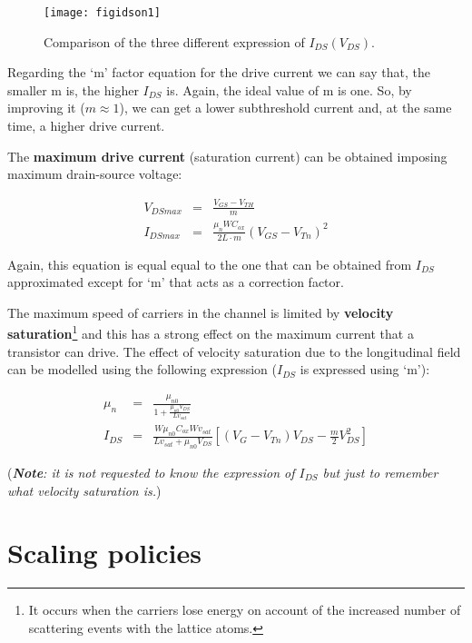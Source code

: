 \documentclass[a4paper, 12pt, twoside, openright]{report}
\begin{document}
	\begin{figure}[H]
	\centering
	\texttt{[image: figidson1]}
	\caption{Comparison of the three different expression of $I_{DS}(V_{DS})$.}
	\label{}
	\end{figure}

Regarding the `m' factor equation for the drive current we can say that, the smaller m is, the higher $I_{DS}$ is. Again, the ideal value of m is one. So, by improving it ($m \approx 1$), we can get a lower subthreshold current and, at the same time, a higher drive current.

The \textbf{maximum drive current} (saturation current) can be obtained imposing maximum drain-source voltage:

	\begin{eqnarray*}
	     V_{DSmax} &=& \frac{V_{GS} - V_{TH}}{m}\\
	   I_{DSmax} &=& \frac{\mu_n W C_{ox}}{2L \cdot  {m}}\left(V_{GS}-V_{Tn}\right)^2
	\end{eqnarray*}

Again, this equation is equal equal to the one that can be obtained from $I_{DS}$ approximated except for `m' that acts as a correction factor.

The maximum speed of carriers in the channel is limited by \textbf{velocity saturation}\footnote{It occurs when the carriers lose energy on account of the increased number of scattering events with the lattice atoms.} and this has a strong effect on the maximum current that a transistor can drive. The effect of velocity saturation due to the longitudinal field can be modelled using the following expression ($I_{DS}$ is expressed using `m'):

	\begin{eqnarray*}
	     \mu_n&=&\frac{\mu_{n0}}{1+\frac{\mu_{n0}V_{DS}}{Lv_{sat}}}\\[2ex]
	   I_{DS} &=&\frac{W \mu_{n0} C_{ox}Wv_{sat}}{Lv_{sat}+\mu_{n0}V_{DS}}
	             \left[\left(V_G-V_{Tn}\right)V_{DS}-\frac{ {m}}{2}V_{DS}^2\right]
	\end{eqnarray*}

(\emph{\textbf{Note}: it is not requested to know the expression of $I_{DS}$ but just to remember what velocity saturation is.})


\newpage
\section{Scaling policies}
\end{document}
